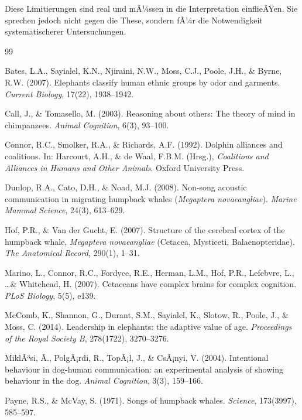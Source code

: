 ﻿\documentclass[12pt,a4paper]{article}
\theoremstyle{definition}
\theoremstyle{remark}
\begin{document}
Diese Limitierungen sind real und mÃ¼ssen in die Interpretation einflieÃŸen.
Sie sprechen jedoch nicht gegen die These, sondern fÃ¼r die Notwendigkeit
systematischerer Untersuchungen.

\begin{thebibliography}{99}

Bates, L.A., Sayialel, K.N., Njiraini, N.W., Moss, C.J., Poole, J.H., \& Byrne, R.W. (2007).
Elephants classify human ethnic groups by odor and garments.
\textit{Current Biology}, 17(22), 1938--1942.

Call, J., \& Tomasello, M. (2003).
Reasoning about others: The theory of mind in chimpanzees.
\textit{Animal Cognition}, 6(3), 93--100.

Connor, R.C., Smolker, R.A., \& Richards, A.F. (1992).
Dolphin alliances and coalitions.
In: Harcourt, A.H., \& de Waal, F.B.M. (Hrsg.), \textit{Coalitions and Alliances in Humans and Other Animals}.
Oxford University Press.

Dunlop, R.A., Cato, D.H., \& Noad, M.J. (2008).
Non-song acoustic communication in migrating humpback whales (\textit{Megaptera novaeangliae}).
\textit{Marine Mammal Science}, 24(3), 613--629.

Hof, P.R., \& Van der Gucht, E. (2007).
Structure of the cerebral cortex of the humpback whale, \textit{Megaptera novaeangliae} (Cetacea, Mysticeti, Balaenopteridae).
\textit{The Anatomical Record}, 290(1), 1--31.

Marino, L., Connor, R.C., Fordyce, R.E., Herman, L.M., Hof, P.R., Lefebvre, L., \ldots \& Whitehead, H. (2007).
Cetaceans have complex brains for complex cognition.
\textit{PLoS Biology}, 5(5), e139.

McComb, K., Shannon, G., Durant, S.M., Sayialel, K., Slotow, R., Poole, J., \& Moss, C. (2014).
Leadership in elephants: the adaptive value of age.
\textit{Proceedings of the Royal Society B}, 278(1722), 3270--3276.

MiklÃ³si, Ã., PolgÃ¡rdi, R., TopÃ¡l, J., \& CsÃ¡nyi, V. (2004).
Intentional behaviour in dog-human communication: an experimental analysis of showing behaviour in the dog.
\textit{Animal Cognition}, 3(3), 159--166.

Payne, R.S., \& McVay, S. (1971).
Songs of humpback whales.
\textit{Science}, 173(3997), 585--597.


\end{thebibliography}
\end{document}
